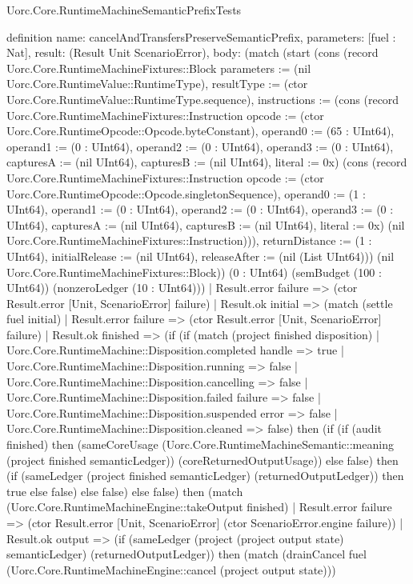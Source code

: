 \begin{lexlean}{Uorc.Core.RuntimeMachineSemanticPrefixTests}
\begin{semanticmodule}
definition{
  name: cancelAndTransfersPreserveSemanticPrefix,
  parameters: [fuel : Nat],
  result: (Result Unit ScenarioError),
  body: (match (start (cons (record Uorc.Core.RuntimeMachineFixtures::Block {parameters := (nil Uorc.Core.RuntimeValue::RuntimeType), resultType := (ctor Uorc.Core.RuntimeValue::RuntimeType.sequence), instructions := (cons (record Uorc.Core.RuntimeMachineFixtures::Instruction {opcode := (ctor Uorc.Core.RuntimeOpcode::Opcode.byteConstant), operand0 := (65 : UInt64), operand1 := (0 : UInt64), operand2 := (0 : UInt64), operand3 := (0 : UInt64), capturesA := (nil UInt64), capturesB := (nil UInt64), literal := 0x}) (cons (record Uorc.Core.RuntimeMachineFixtures::Instruction {opcode := (ctor Uorc.Core.RuntimeOpcode::Opcode.singletonSequence), operand0 := (1 : UInt64), operand1 := (0 : UInt64), operand2 := (0 : UInt64), operand3 := (0 : UInt64), capturesA := (nil UInt64), capturesB := (nil UInt64), literal := 0x}) (nil Uorc.Core.RuntimeMachineFixtures::Instruction))), returnDistance := (1 : UInt64), initialRelease := (nil UInt64), releaseAfter := (nil (List UInt64))}) (nil Uorc.Core.RuntimeMachineFixtures::Block)) (0 : UInt64) (semBudget (100 : UInt64)) (nonzeroLedger (10 : UInt64)))
    | Result.error failure => (ctor Result.error [Unit, ScenarioError] failure)
    | Result.ok initial => (match (settle fuel initial)
      | Result.error failure => (ctor Result.error [Unit, ScenarioError] failure)
      | Result.ok finished => (if (if (match (project finished disposition)
        | Uorc.Core.RuntimeMachine::Disposition.completed handle => true
        | Uorc.Core.RuntimeMachine::Disposition.running => false
        | Uorc.Core.RuntimeMachine::Disposition.cancelling => false
        | Uorc.Core.RuntimeMachine::Disposition.failed failure => false
        | Uorc.Core.RuntimeMachine::Disposition.suspended error => false
        | Uorc.Core.RuntimeMachine::Disposition.cleaned => false) then (if (if (audit finished) then (sameCoreUsage (Uorc.Core.RuntimeMachineSemantic::meaning (project finished semanticLedger)) (coreReturnedOutputUsage)) else false) then (if (sameLedger (project finished semanticLedger) (returnedOutputLedger)) then true else false) else false) else false) then (match (Uorc.Core.RuntimeMachineEngine::takeOutput finished)
        | Result.error failure => (ctor Result.error [Unit, ScenarioError] (ctor ScenarioError.engine failure))
        | Result.ok output => (if (sameLedger (project (project output state) semanticLedger) (returnedOutputLedger)) then (match (drainCancel fuel (Uorc.Core.RuntimeMachineEngine::cancel (project output state)))
}
\end{semanticmodule}
\end{lexlean}

